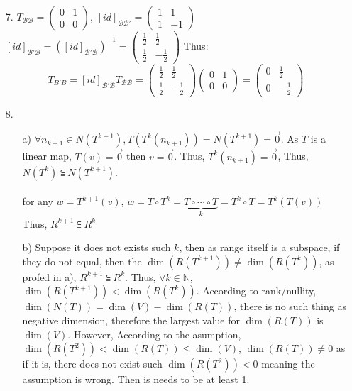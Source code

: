 \documentclass{article}
\begin{document}
\begin{itemize}
    \item [7.]
    \(T_{\mathcal{BB}} = \begin{pmatrix}
        0&1\\0&0
    \end{pmatrix}\), \([id]_{\mathcal{BB'}} = \begin{pmatrix}
        1&1\\1&-1
    \end{pmatrix}\)
    \([id]_{\mathcal{B'B}}  = \left([id]_{\mathcal{B'B}}\right)^{-1}= \begin{pmatrix}
        \frac{1}{2}&\frac{1}{2}\\\frac{1}{2}&-\frac{1}{2}
    \end{pmatrix}\) Thus: \[T_{B'B} = [id]_{\mathcal{B'B}}T_{\mathcal{BB}} = \begin{pmatrix}
        \frac{1}{2}&\frac{1}{2}\\\frac{1}{2}&-\frac{1}{2}
    \end{pmatrix}\begin{pmatrix}
        0&1\\0&0
    \end{pmatrix} = \begin{pmatrix}
        0&\frac{1}{2}\\0&-\frac{1}{2}
    \end{pmatrix}\]
    \item [8.]
    \begin{itemize}
        \item [a)] \(\forall n_{k+1}\in N(T^{k+1}), T(T^k(n_{k+1})) = N(T^{k+1}) = \overrightarrow{0}\). As \(T\) is a linear map, \(T(v) = \overrightarrow{0}\) then \(v = \overrightarrow{0}\). Thus, \(T^k(n_{k+1})= \overrightarrow{0}\), Thus, \(N(T^k)\subseteqq N(T^{k+1})\).\\
        \\ 
        for any \(w = T^{k+1}(v)\), \(w = T\circ T^k = \underbrace{T\circ\cdots\circ T}_{k} = T^k \circ T = T^k(T(v))\)
        Thus, \(R^{k+1}\subseteqq R^k\)
        \item [b)]Suppose it does not exists such \(k\), then as range itself is a subspace, if they do not equal, then the \(\dim(R(T^{k+1}))\neq\dim(R(T^{k}))\), as profed in a), \(R^{k+1}\subseteqq R^k\). Thus, \(\forall k\in\mathbb{N}\), 
        \(\dim(R(T^{k+1}))<\dim(R(T^{k}))\). According to rank/nullity, \(\dim(N(T)) = \dim(V)-\dim(R(T))\), there is no such thing as negative dimension, therefore the largest value for \(\dim(R(T))\) is \(\dim(V)\). However, According to the asumption,
        \(\dim(R(T^{2}))<\dim(R(T))\leq \dim(V)\), \(\dim(R(T))\neq 0 \) as if it is, there does not exist such \(\dim(R(T^2))<0\) meaning the assumption is wrong. Then is needs to be at least 1.

\end{itemize}
\end{itemize}
\end{document}
